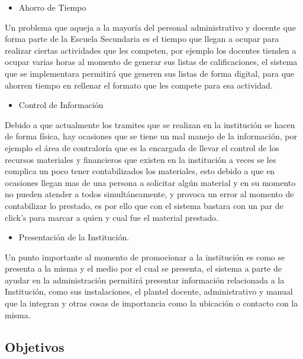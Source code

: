 \begin{itemize}
\item Ahorro de Tiempo
\end{itemize}
{\large Un problema que aqueja a la mayoría del personal administrativo y docente que forma parte de la Escuela Secundaria es el tiempo que llegan a ocupar para realizar ciertas actividades que les competen, por ejemplo los docentes tienden a ocupar varias horas al momento de generar sus listas de calificaciones, el sistema que se implementara permitirá que generen sus listas de forma digital, para que ahorren tiempo en rellenar el formato que les compete para esa actividad. }\\

\begin{itemize}
\item Control de Información
\end{itemize}
{\large Debido a que actualmente los tramites que se realizan en la institución se hacen de forma física, hay ocasiones que se tiene un mal manejo de la información, por ejemplo el área de contraloría que es la encargada de llevar el control de los recursos materiales y financieros que existen en la institución a veces se les complica un poco tener contabilizados los materiales, esto debido a que en ocasiones llegan mas de una persona a solicitar algún material y en su momento no pueden atender a todos simultáneamente, y provoca un error al momento de contabilizar lo prestado, es por ello que con el sistema bastara con un par de click’s para marcar a quien y cual fue el material prestado.}\\

\begin{itemize}
\item Presentación de la Institución.
\end{itemize}
{\large Un punto importante al momento de promocionar a la institución es como se presenta a la misma y el medio por el cual se presenta, el sistema a parte de ayudar en la administración permitirá presentar información relacionada a la Institución, como sus instalaciones, el plantel docente, administrativo y manual que la integran y otras cosas de importancia como la ubicación o contacto con la misma.}\\

\subsection{Objetivos}

